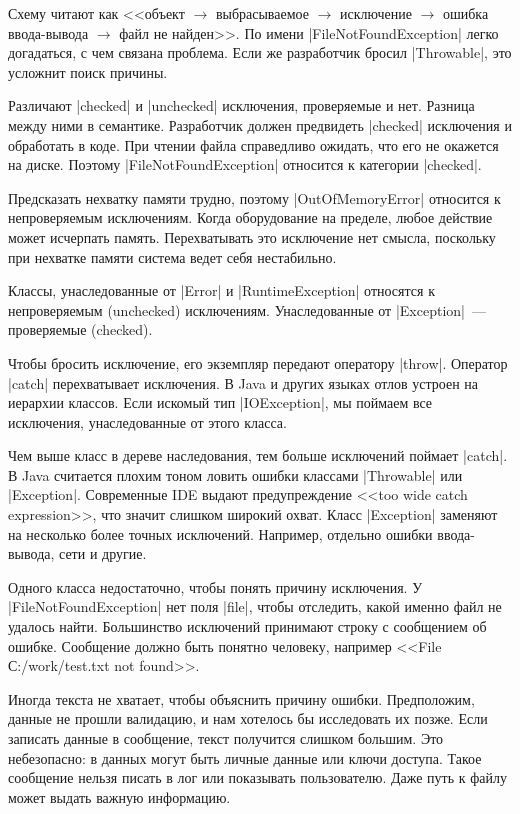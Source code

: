 Схему читают как <<объект $\to$ выбрасываемое $\to$ исключение $\to$ ошибка
ввода-вывода $\to$ файл не найден>>. По имени \spverb|FileNotFoundException|
легко догадаться, с чем связана проблема. Если же разработчик бросил
\spverb|Throwable|, это усложнит поиск причины.

Различают \spverb|checked| и \spverb|unchecked| исключения, проверяемые и
нет. Разница между ними в семантике. Разработчик должен предвидеть
\spverb|checked| исключения и обработать в коде. При чтении файла справедливо
ожидать, что его не окажется на диске. Поэтому \spverb|FileNotFoundException|
относится к категории \spverb|checked|.

Предсказать нехватку памяти трудно, поэтому \spverb|OutOfMemoryError| относится
к непроверяемым исключениям. Когда оборудование на пределе, любое действие может
исчерпать память. Перехватывать это исключение нет смысла, поскольку при
нехватке памяти система ведет себя нестабильно.

Классы, унаследованные от \spverb|Error| и \spverb|RuntimeException| относятся к
непроверяемым (unchecked) исключениям. Унаследованные от \spverb|Exception|~---
проверяемые (checked).

Чтобы бросить исключение, его экземпляр передают оператору
\spverb|throw|. Оператор \spverb|catch| перехватывает исключения. В Java и
других языках отлов устроен на иерархии классов. Если искомый тип
\spverb|IOException|, мы поймаем все исключения, унаследованные от этого класса.

Чем выше класс в дереве наследования, тем больше исключений поймает
\spverb|catch|. В Java считается плохим тоном ловить ошибки классами
\spverb|Throwable| или \spverb|Exception|. Современные IDE выдают предупреждение
<<too wide catch expression>>, что значит слишком широкий охват. Класс
\spverb|Exception| заменяют на несколько более точных исключений. Например,
отдельно ошибки ввода-вывода, сети и другие.

Одного класса недостаточно, чтобы понять причину исключения. У
\spverb|FileNotFoundException| нет поля \spverb|file|, чтобы отследить, какой
именно файл не удалось найти. Большинство исключений принимают строку с
сообщением об ошибке. Сообщение должно быть понятно человеку, например <<File
С:/work/test.txt not found>>.

Иногда текста не хватает, чтобы объяснить причину ошибки. Предположим, данные не
прошли валидацию, и нам хотелось бы исследовать их позже. Если записать данные в
сообщение, текст получится слишком большим. Это небезопасно: в данных могут быть
личные данные или ключи доступа. Такое сообщение нельзя писать в лог или
показывать пользователю. Даже путь к файлу может выдать важную информацию.

